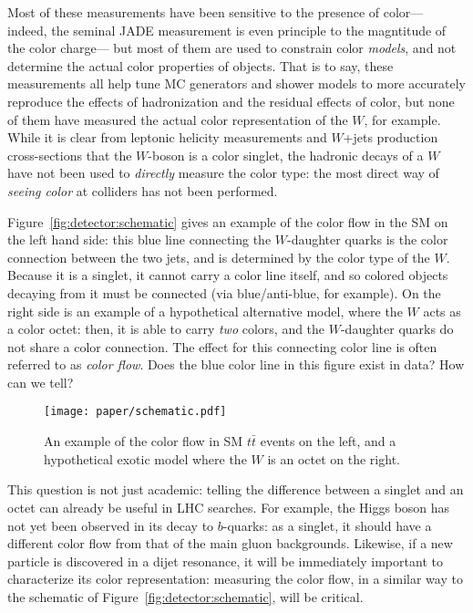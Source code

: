Most of these measurements have been sensitive to the presence of color--- indeed, the seminal JADE measurement is even principle to the magntitude of the color charge--- but most of them are used to constrain color \textit{models}, and not determine the actual color properties of objects. That is to say, these measurements all help tune MC generators and shower models to more accurately reproduce the effects of hadronization and the residual effects of color, but none of them have measured the actual color representation of the $W$, for example. While it is clear from leptonic helicity measurements and $W$+jets production cross-sections that the $W$-boson is a color singlet, the hadronic decays of a $W$ have not been used to \textit{directly} measure the color type: the most direct way of \textit{seeing color} at colliders has not been performed.

Figure~\ref{fig:detector:schematic} gives an example of the color flow in the SM on the left hand side: this blue line connecting the $W$-daughter quarks is the color connection between the two jets, and is determined by the color type of the $W$. Because it is a singlet, it cannot carry a color line itself, and so colored objects decaying from it must be connected (via blue/anti-blue, for example). On the right side is an example of a hypothetical alternative model, where the $W$ acts as a color octet: then, it is able to carry \textit{two} colors, and the $W$-daughter quarks do not share a color connection. The effect for this connecting color line is often referred to as \textit{color flow}. Does the blue color line in this figure exist in data? How can we tell? 


\begin{figure}
\centering
\texttt{[image: paper/schematic.pdf]}
\label{fig:color:motivation:schematic}
\caption{An example of the color flow in SM $t\bar{t}$ events on the left, and a hypothetical exotic model where the $W$ is an octet on the right.}
\end{figure}


This question is not just academic: telling the difference between a singlet and an octet can already be useful in LHC searches. For example, the Higgs boson has not yet been observed in its decay to $b$-quarks: as a singlet, it should have a different color flow from that of the main gluon backgrounds. Likewise, if a new particle is discovered in a dijet resonance, it will be immediately important to characterize its color representation: measuring the color flow, in a similar way to the schematic of Figure~\ref{fig:detector:schematic}, will be critical. 

